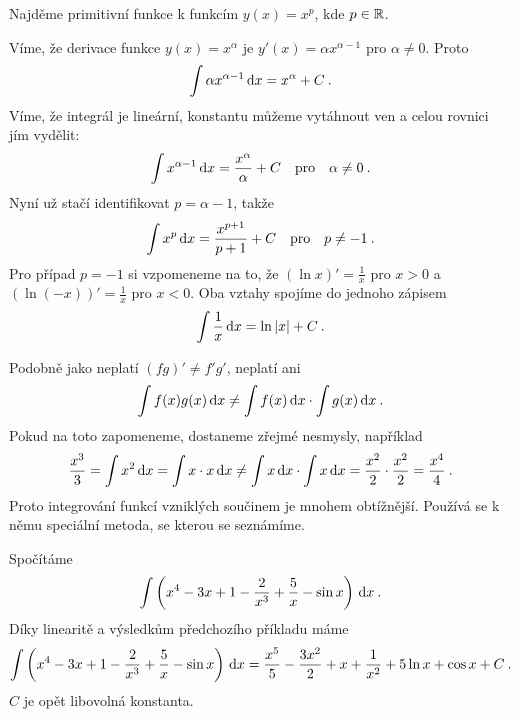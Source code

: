 \begin{example}
    Najděme primitivní funkce k funkcím $y(x) = x^p$, kde $p \in \mathbb{R}$.
    
    Víme, že derivace funkce $y(x) = x^\alpha$ je $y'(x) = \alpha x^{\alpha - 1}$ pro $\alpha \neq 0$. Proto \begin{align}
        \int \alpha x^{\alpha - 1} \, \mathrm{d} x = x^\alpha + C\:.
    \end{align}
    Víme, že integrál je lineární, konstantu můžeme vytáhnout ven a celou rovnici jím vydělit:
    \begin{align}
        \int x^{\alpha - 1} \, \mathrm{d} x = \frac{x^\alpha}{\alpha} +C \quad \text{pro} \quad \alpha \neq 0 \:.
    \end{align}
    Nyní už stačí identifikovat $p = \alpha - 1$, takže \begin{align}
        \int x^p \, \mathrm{d} x = \frac{x^{p+1}}{p+1} + C\quad \text{pro} \quad p \neq -1 \:.
    \end{align}
    Pro případ $p = -1$ si vzpomeneme na to, že $(\ln x)' = \frac{1}{x}$ pro $x>0$ a $(\ln (-x))' = \frac{1}{x}$ pro $x<0$. Oba vztahy spojíme do jednoho zápisem
    \begin{align}
        \int \frac{1}{x} \, \mathrm{d} x = \ln |x| + C \:.
    \end{align}
\end{example}

\begin{example}[Varování]
    Podobně jako neplatí $(fg)' \neq f' g'$, neplatí ani \begin{align}
        \int f(x) g(x) \, \mathrm{d} x \neq \int f(x) \, \mathrm{d} x \cdot \int g(x) \, \mathrm{d} x \:.
    \end{align}
    Pokud na toto zapomeneme, dostaneme zřejmé nesmysly, například \begin{align}
        \frac{x^3}{3} = \int x^2 \, \mathrm{d} x = \int x \cdot x \, \mathrm{d} x 
        \neq \int x \, \mathrm{d} x \cdot \int x \, \mathrm{d} x = \frac{x^2}{2} \cdot \frac{x^2}{2} = \frac{x^4}{4} \:.
    \end{align}
    Proto integrování funkcí vzniklých součinem je mnohem obtížnější. Používá se k němu speciální metoda, se kterou se seznámíme.
\end{example}

\begin{example}
    Spočítáme \begin{align}
        \int \left( x^4 - 3x + 1 - \frac{2}{x^3} + \frac{5}{x} - \sin x \right) \, \mathrm{d} x \:.
    \end{align}
    Díky linearitě a výsledkům předchozího příkladu máme \begin{align}
        \int \left( x^4 - 3x + 1 - \frac{2}{x^3} + \frac{5}{x} - \sin x \right) \, \mathrm{d} x = \frac{x^5}{5} - \frac{3x^2}{2} + x + \frac{1}{x^2} + 5 \ln x + \cos x + C \:.
    \end{align}
    $C$ je opět libovolná konstanta.
\end{example}

